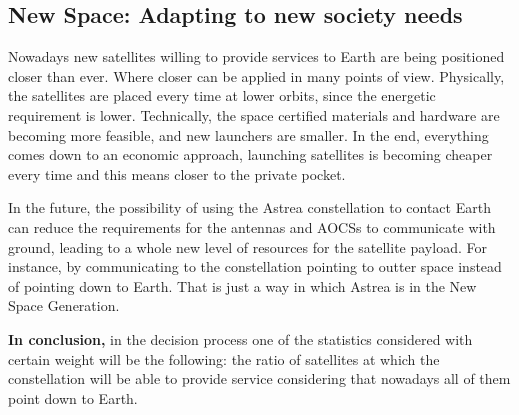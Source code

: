\subsection{New Space: Adapting to new society needs}
Nowadays new satellites willing to provide services to Earth are being positioned closer than ever. Where closer can be applied in many points of view. Physically, the satellites are placed every time at lower orbits, since the energetic requirement is lower. Technically, the space certified materials and hardware are becoming more feasible, and new launchers are smaller. In the end, everything comes down to an economic approach, launching satellites is becoming cheaper every time and this means closer to the private pocket.

In the future, the possibility of using the Astrea constellation to contact Earth can reduce the requirements for the antennas and AOCSs to communicate with ground, leading to a whole new level of resources for the satellite payload. For instance, by communicating to the constellation pointing to outter space instead of pointing down to Earth. That is just a way in which Astrea is in the New Space Generation.

\textbf{In conclusion,} in the decision process one of the statistics considered with certain weight will be the following: the ratio of satellites at which the constellation will be able to provide service considering that nowadays all of them point down to Earth. 